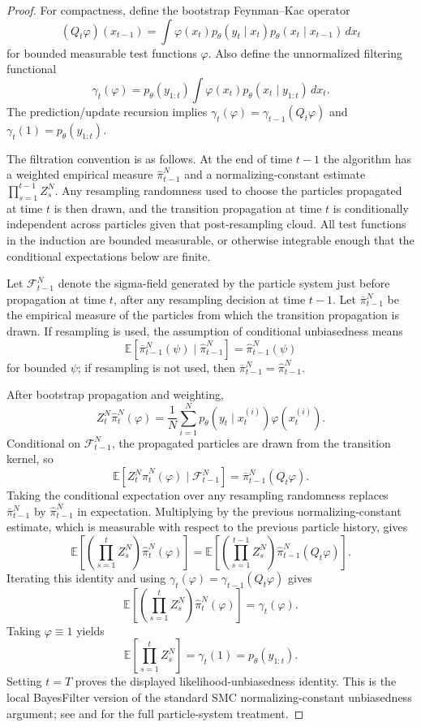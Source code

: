 \begin{proof}
For compactness, define the bootstrap Feynman--Kac operator
\[
  (Q_t\varphi)(x_{t-1})
  =
  \int \varphi(x_t)
       p_\theta(y_t\mid x_t)
       p_\theta(x_t\mid x_{t-1})\,dx_t
\]
for bounded measurable test functions $\varphi$.  Also define the unnormalized
filtering functional
\[
  \gamma_t(\varphi)
  =
  p_\theta(y_{1:t})
  \int \varphi(x_t)p_\theta(x_t\mid y_{1:t})\,dx_t .
\]
The prediction/update recursion implies
$\gamma_t(\varphi)=\gamma_{t-1}(Q_t\varphi)$ and
$\gamma_t(1)=p_\theta(y_{1:t})$.

The filtration convention is as follows.  At the end of time $t-1$ the
algorithm has a weighted empirical measure $\hat\pi_{t-1}^N$ and a
normalizing-constant estimate $\prod_{s=1}^{t-1}Z_s^N$.  Any resampling
randomness used to choose the particles propagated at time $t$ is then drawn,
and the transition propagation at time $t$ is conditionally independent across
particles given that post-resampling cloud.  All test functions in the induction
are bounded measurable, or otherwise integrable enough that the conditional
expectations below are finite.

Let $\mathcal F_{t-1}^N$ denote the sigma-field generated by the particle
system just before propagation at time $t$, after any resampling decision at
time $t-1$.  Let $\bar\pi_{t-1}^N$ be the empirical measure of the particles
from which the transition propagation is drawn.  If resampling is used, the
assumption of conditional unbiasedness means
\[
  \mathbb E[\bar\pi_{t-1}^N(\psi)\mid \hat\pi_{t-1}^N]
  =
  \hat\pi_{t-1}^N(\psi)
\]
for bounded $\psi$; if resampling is not used, then
$\bar\pi_{t-1}^N=\hat\pi_{t-1}^N$.

After bootstrap propagation and weighting,
\[
  Z_t^N \hat\pi_t^N(\varphi)
  =
  \frac{1}{N}\sum_{i=1}^N
  p_\theta(y_t\mid x_t^{(i)})\varphi(x_t^{(i)}).
\]
Conditional on $\mathcal F_{t-1}^N$, the propagated particles are drawn from
the transition kernel, so
\[
  \mathbb E\!\left[
    Z_t^N\hat\pi_t^N(\varphi)\mid \mathcal F_{t-1}^N
  \right]
  =
  \bar\pi_{t-1}^N(Q_t\varphi).
\]
Taking the conditional expectation over any resampling randomness replaces
$\bar\pi_{t-1}^N$ by $\hat\pi_{t-1}^N$ in expectation.  Multiplying by the
previous normalizing-constant estimate, which is measurable with respect to the
previous particle history, gives
\[
  \mathbb E\!\left[
    \left(\prod_{s=1}^t Z_s^N\right)\hat\pi_t^N(\varphi)
  \right]
  =
  \mathbb E\!\left[
    \left(\prod_{s=1}^{t-1} Z_s^N\right)
    \hat\pi_{t-1}^N(Q_t\varphi)
  \right].
\]
Iterating this identity and using
$\gamma_t(\varphi)=\gamma_{t-1}(Q_t\varphi)$ gives
\[
  \mathbb E\!\left[
    \left(\prod_{s=1}^t Z_s^N\right)\hat\pi_t^N(\varphi)
  \right]
  =
  \gamma_t(\varphi).
\]
Taking $\varphi\equiv 1$ yields
\[
  \mathbb{E}\left[\prod_{s=1}^t Z_s^N\right]
  =
  \gamma_t(1)
  =
  p_\theta(y_{1:t}).
\]
Setting $t=T$ proves the displayed likelihood-unbiasedness identity.  This is
the local BayesFilter version of the standard SMC normalizing-constant
unbiasedness argument; see \citet{doucet2001sequential} and
\citet{andrieu2010particle} for the full particle-system treatment.
\end{proof}

